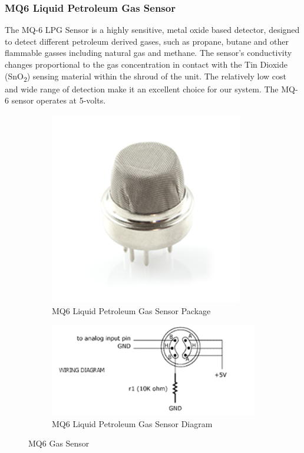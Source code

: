\subsubsection{MQ6 Liquid Petroleum Gas Sensor}
\par The MQ-6 LPG Sensor is a highly sensitive, metal oxide based detector\cite{Dey}, designed to detect different petroleum derived gases, such as propane, butane and other flammable gasses including natural gas and methane. The sensor's conductivity changes proportional to the gas concentration in contact with the Tin Dioxide (SnO\textsubscript{2}) sensing material within the shroud of the unit. The relatively low cost and wide range of detection make it an excellent choice for our system. The MQ-6 sensor operates at 5-volts.
\begin{figure}[h!]
	\centering
	\begin{subfigure}[t]{0.22\textwidth}
		\centering
		\includegraphics[width=.8\textwidth]{mq6.png}
		\caption{MQ6 Liquid Petroleum Gas Sensor Package}
	\end{subfigure}
	\begin{subfigure}[t]{0.22\textwidth}
		\centering
		\includegraphics[width=\textwidth]{mq6diag.png}
		\caption{MQ6 Liquid Petroleum Gas Sensor Diagram}
	\end{subfigure}
	\caption{MQ6 Gas Sensor}
\end{figure}
